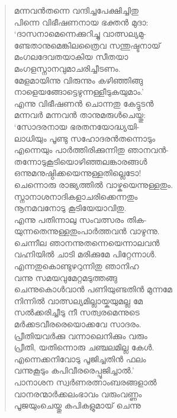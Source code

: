 \begin{verse}
മന്നവന്‍തന്നെ വന്ദിച്ചപേക്ഷിച്ചിതു\\
പിന്നെ വിഭീഷണനായ ഭക്തന്‍ മുദാ:\\
‘ദാസനാമെന്നെക്കുറിച്ചു വാത്സല്യമു-\\
ണ്ടേതാനുമെങ്കിലത്രൈവ സന്തുഷ്ടനായ്\\
മംഗലദേവതയാകിയ സീതയാ\\
മംഗളസ്നാനവുമാചരിച്ചീടണം.\\
മേളമായിന്നു വിരുന്നും കഴിഞ്ഞിങ്ങു\\
നാളെയങ്ങോട്ടെഴുന്നള്ളീടുകയുമാം.’\\
എന്നു വിഭീഷണന്‍ ചൊന്നതു കേട്ടുടന്‍\\
മന്നവര്‍ മന്നവന്‍ താനുമരുള്‍ചെയ്തു:\\
‘സോദരനായ ഭരതനയോദ്ധ്യയി-\\
ലാധിയും പൂണ്ടു സഹോദരന്‍തന്നൊടും\\
എന്നെയും പാര്‍ത്തിരിക്കുന്നിതു ഞാനവന്‍-\\
തന്നോടുകൂടിയൊഴിഞ്ഞലങ്കാരങ്ങള്‍\\
ഒന്നുമനുഷ്ഠിക്കയെന്നുള്ളതില്ലെടോ!\\
ചെന്നൊരു രാജ്യത്തില്‍ വാഴ്കയെന്നുള്ളതും.\\
സ്നാനാശനാദികളാചരിക്കെന്നതും\\
നൂനമവനോടു കൂടിയേയാവിതു.\\
എന്നു പതിന്നാലു സംവത്സരം തിക-\\
യുന്നതെന്നുള്ളതുംപാര്‍ത്തവന്‍ വാഴുന്നു.\\
ചെന്നീല ഞാനന്നുതന്നെയെന്നാലവന്‍\\
വഹ്നിയില്‍ ചാടി മരിക്കുമേ പിറ്റേന്നാള്‍.\\
എന്നതുകൊണ്ടുഴറുന്നിതു ഞാനിഹ\\
വന്നു സമയവുമേറ്റമടുത്തങ്ങു\\
ചെന്നുകൊള്‍വാന്‍ പണിയുണ്ടതിന്‍ മുന്നമേ\\
നിന്നില്‍ വാത്സല്യമില്ലായ്കയുമല്ല മേ\\
സല്‍ക്കരിച്ചീടു നീ സത്വരമെന്നുടെ\\
മര്‍ക്കടവീരരെയൊക്കവേ സാദരം.\\
പ്രീതിയവര്‍ക്കു വന്നാലെനിക്കും വരും\\
പ്രീതി, യതിന്നൊരു ചഞ്ചലമില്ല കേള്‍.\\
എന്നെക്കനിവോടു പൂജിച്ചതിന്‍ ഫലം\\
വന്നുകൂടും കപിവീരരെപ്പൂജിച്ചാല്‍.’\\
പാനാശന സ്വര്‍ണരത്നാംബരങ്ങളാല്‍\\
വാനരന്മാര്‍ക്കലംഭാവം വരുംവണ്ണം\\
പൂജയുംചെയ്തു കപികളുമായ് ചെന്നു\\

\end{verse}

